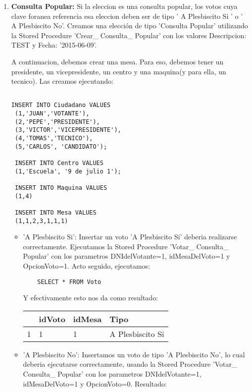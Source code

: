 \begin{enumerate}

\item \textbf{Consulta Popular:} Si la eleccion es una consulta popular, los votos cuya clave foranea
referencia esa eleccion deben ser de tipo ' A Plesbiscito Si ' o ' A Plesbiscito No'. Creamos una elección de tipo 'Consulta Popular' utilizando la Stored Procedure 'Crear\_ Consulta\_ Popular' con los valores Descripcion: TEST y Fecha: '2015-06-09'. 

A continuacion, debemos crear una mesa. Para eso, debemos tener un presidente, un vicepresidente,
un centro y una maquina(y para ella, un tecnico). Las creamos ejecutando:

\begin{lstlisting}

INSERT INTO Ciudadano VALUES
 (1,'JUAN','VOTANTE'),
 (2,'PEPE','PRESIDENTE'),
 (3,'VICTOR','VICEPRESIDENTE'),
 (4,'TOMAS','TECNICO'),
 (5,'CARLOS', 'CANDIDATO');

 INSERT INTO Centro VALUES
 (1,'Escuela', '9 de julio 1');

 INSERT INTO Maquina VALUES
 (1,4)

 INSERT INTO Mesa VALUES
 (1,1,2,3,1,1,1)
\end{lstlisting}

	\begin{itemize}
	\item 'A Plesbiscito Si': Insertar un voto 'A Plesbiscito Si' deberia realizarse correctamente.
	Ejecutamos la Stored Procedure 'Votar\_ Consulta\_ Popular' con los parametros DNIdelVotante=1, idMesaDelVoto=1 y OpcionVoto=1. Acto seguido, ejecutamos:
	\begin{lstlisting}
	SELECT * FROM Voto
	\end{lstlisting}
	Y efectivamente esto nos da como resultado:	
	\vspace{2mm}
	
	\begin{tabular}{| l| l| l| l| }
	\hline 
	   & idVoto & idMesa & Tipo \\
	   \hline
	 1 & 1 & 1 & A Plesbiscito Si \\
 	 \hline 
	\end{tabular}
	
	\vspace{2mm}
	\item 'A Plesbiscito No': Insertamos un voto de tipo 'A Plesbiscito No', lo cual deberia ejecutarse correctamente, usando la Stored Procedure 'Votar\_ Consulta\_ Popular' con los parametros DNIdelVotante=1, idMesaDelVoto=1 y OpcionVoto=0. Resultado:
	

\end{itemize}
\end{enumerate}
